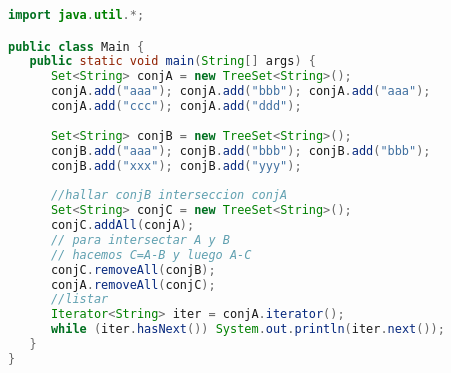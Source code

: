 \begin{lstlisting}[language=Java]
import java.util.*;

public class Main {
   public static void main(String[] args) {
      Set<String> conjA = new TreeSet<String>();
      conjA.add("aaa"); conjA.add("bbb"); conjA.add("aaa");
      conjA.add("ccc"); conjA.add("ddd");
      
      Set<String> conjB = new TreeSet<String>();
      conjB.add("aaa"); conjB.add("bbb"); conjB.add("bbb");
      conjB.add("xxx"); conjB.add("yyy");
      
      //hallar conjB interseccion conjA
      Set<String> conjC = new TreeSet<String>();
      conjC.addAll(conjA);
      // para intersectar A y B
      // hacemos C=A-B y luego A-C
      conjC.removeAll(conjB);
      conjA.removeAll(conjC);
      //listar
      Iterator<String> iter = conjA.iterator();
      while (iter.hasNext()) System.out.println(iter.next());
   }
}
\end{lstlisting}
